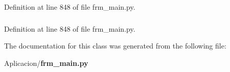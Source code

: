 \-Definition at line 848 of file frm\-\_\-main.\-py.

\subsubsection[{sat\-\_\-id}]{}\label{class_aplicacion_1_1frm__main_1_1_representacion_grafica_aa724a1066343c396a2e7b5c20e589422}


\-Definition at line 848 of file frm\-\_\-main.\-py.



\-The documentation for this class was generated from the following file\-:\begin{DoxyCompactItemize}
\item 
\-Aplicacion/{\bf frm\-\_\-main.\-py}\end{DoxyCompactItemize}
